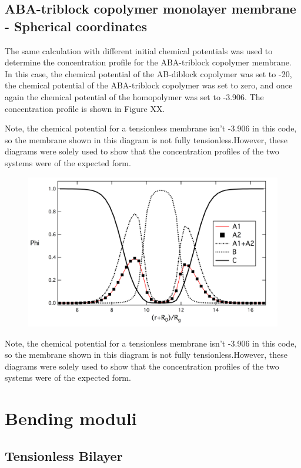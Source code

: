 \documentclass[11pt]{article} %
\begin{document}
\subsection{ABA-triblock copolymer monolayer membrane - Spherical coordinates}

The same calculation with different initial chemical potentials was used to determine the concentration profile for the ABA-triblock copolymer membrane. In this case, the chemical potential of the AB-diblock copolymer was set to -20, the chemical potential of the ABA-triblock copolymer was set to zero, and once again the chemical potential of the homopolymer was set to -3.906. The concentration profile is shown in Figure XX.

Note, the chemical potential for a tensionless membrane isn't -3.906 in this code, so the membrane shown in this diagram is not fully tensionless.However, these diagrams were solely used to show that the concentration profiles of the two systems were of the expected form.
\begin{figure}[H]
\centering
\includegraphics[scale=0.6]{monolayer_ABA}
\centering
\end{figure}

Note, the chemical potential for a tensionless membrane isn't -3.906 in this code, so the membrane shown in this diagram is not fully tensionless.However, these diagrams were solely used to show that the concentration profiles of the two systems were of the expected form.
\section{Bending moduli}

\subsection{Tensionless Bilayer}
\end{document}
